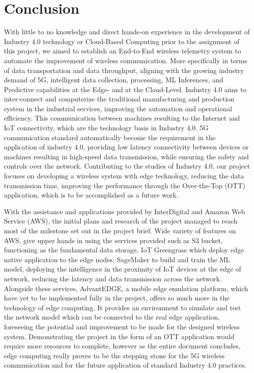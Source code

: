 
\chapter{Conclusion} \label{Chapter:sixth} 
With little to no knowledge and direct hands-on experience in the development of Industry 4.0 technology or Cloud-Based Computing prior to the assignment of this project, we aimed to establish an End-to-End wireless telemetry system to automate the improvement of wireless communication. More specifically in terms of data transportation and data throughput, aligning with the growing industry demand of 5G, intelligent data collection, processing, ML Inferences, and Predictive capabilities at the Edge- and at the Cloud-Level. Industry 4.0 aims to inter-connect and computerize the traditional manufacturing and production system in the industrial services, improving the automation and operational efficiency. This communication between machines resulting to the Internet and IoT connectivity, which are the technology basis in Industry 4.0. 5G communication standard automatically become the requirement in the application of industry 4.0, providing low latency connectivity between devices or machines resulting in high-speed data transmission, while ensuring the safety and controls over the network. Contributing to the studies of Industry 4.0, our project focuses on developing a wireless system with edge technology, reducing the data transmission time, improving the performance through the  Over-the-Top (OTT) application, which is to be accomplished as a future work. 

With the assistance and applications provided by InterDigital and Amazon Web Service (AWS), the initial plans and research of the project managed to reach most of the milestone set out in the project brief. Wide variety of features on AWS, give upper hands in using the services provided such as S3 bucket, functioning as the fundamental data storage, IoT Greengrass which deploy edge native application to the edge nodes, SageMaker to build and train the ML model, deploying the intelligence in the proximity of IoT devices at the edge of network, reducing the latency and data transmission across the network. Alongside these services, AdvantEDGE, a mobile edge emulation platform, which have yet to be implemented fully in the project, offers so much more in the technology of edge computing. It provides an environment to simulate and test the network model which can be connected to the real edge application, foreseeing the potential and improvement to be made for the designed wireless system. Demonstrating the project in the form of an OTT application would require more resources to complete, however as the entire document concludes, edge computing really proves to be the stepping stone for the 5G wireless communication and for the future application of standard Industry 4.0 practices.



